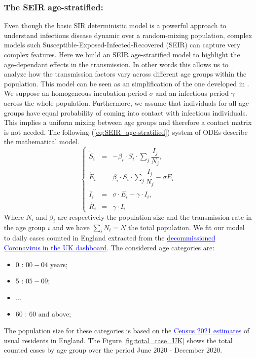 \documentclass[nonatbib,preprint,12pt,authoryear]{elsarticle}
\begin{document}
\subsubsection{The SEIR age-stratified:}
Even though the basic SIR deterministic model is a powerful approach to understand infectious disease dynamic over a random-mixing population, complex models such Susceptible-Exposed-Infected-Recovered (SEIR) can capture very complex features. Here we build an SEIR age-stratified model to highlight the age-dependant effects in the transmission. In other words this allows us to analyze how the transmission factors vary across different age groups within the population. This model can be seen as an simplification of the one developed in  \cite{davies_age-dependent_2020}. We suppose an homogeneous incubation period $\sigma$ and an infectious period $\gamma$ across the whole population. Furthermore, we assume that individuals for all age groups have equal probability of coming into contact with infectious individuals. This implies a uniform mixing between age groups and therefore a contact matrix is not needed. 
The following (\ref{eq:SEIR_age-stratified}) system of ODEs describe the mathematical model.
\begin{equation}
    \label{eq:SEIR_age-stratified}
    \left\{\begin{array}{rcl} 
        \Dot{S}_i &=& -\beta_i \cdot S_i \cdot \sum_j\dfrac{I_j}{N_j}, \\
        \Dot{E}_i &=& \beta_i \cdot S_i \cdot \sum_j\dfrac{I_j}{N_j} - \sigma E_i\\
        \Dot{I}_i &=&  \sigma \cdot E_i - \gamma \cdot I_i, \\
        \Dot{R_i} &=& \gamma \cdot I_i
    \end{array}\right.
    \end{equation}
Where $N_i$ and $\beta_i$ are respectively the population size and the transmission rate in the age group $i$ and we have $\sum_i N_i = N$ the total population.
We fit our model to daily cases counted in England extracted from the  \href{https://ukhsa-dashboard.data.gov.uk/covid-19-archive-data-download}{\textcolor{blue}{decommissioned Coronavirus in the UK dashboard}}. The considered age categories are: 
\begin{itemize}
    \item 0 : $00-04$ years;
    \item 5 : $05-09$;
    \item $\ldots$ 
    \item 60 : 60 and above; 
\end{itemize}
The population size for these categories is based on the \href{https://www.ons.gov.uk/datasets/TS007/editions/2021/versions/3/filter-outputs/5c265388-33f5-4c92-a6de-bb7f220afb63#get-data}{\textcolor{blue}{Census 2021 estimates}} of usual residents in England. The Figure \ref{fig:total_case_UK} shows the total counted cases by age group over the period June $2020$ - December $2020$. 
\end{document}
